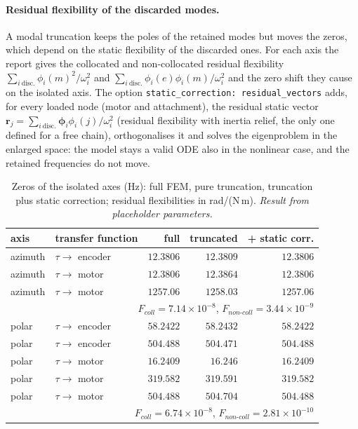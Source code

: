 \documentclass[10pt,a4paper]{article}
\numberwithin{equation}{section}
\begin{document}
\paragraph{Residual flexibility of the discarded modes.} A modal truncation keeps the poles of the retained modes but moves the zeros, which depend on the static flexibility of the discarded ones. For each axis the report gives the collocated and non-collocated residual flexibility $\sum_{i\ \text{disc.}}\phi_i(m)^2/\omega_i^2$ and $\sum_{i\ \text{disc.}}\phi_i(e)\phi_i(m)/\omega_i^2$ and the zero shift they cause on the isolated axis. The option \texttt{static\_correction: residual\_vectors} adds, for every loaded node (motor and attachment), the residual static vector $\mathbf r_j = \sum_{i\ \text{disc.}}\boldsymbol\phi_i\phi_i(j)/\omega_i^2$ (residual flexibility with inertia relief, the only one defined for a free chain), orthogonalises it and solves the eigenproblem in the enlarged space: the model stays a valid ODE also in the nonlinear case, and the retained frequencies do not move.
\begin{table}[H]\centering\small
\caption{Zeros of the isolated axes (Hz): full FEM, pure truncation, truncation plus static correction; residual flexibilities in rad/(N\,m). \emph{Result from placeholder parameters.}}\label{tab:modal_zeros}
\begin{tabular}{llrrr}\toprule
axis & transfer function & full & truncated & + static corr. \\ \midrule
azimuth & $\tau\to$ encoder & $12.3806$ & $12.3809$ & $12.3806$ \\
azimuth & $\tau\to$ motor & $12.3806$ & $12.3864$ & $12.3806$ \\
azimuth & $\tau\to$ motor & $1257.06$ & $1258.03$ & $1257.06$ \\
\multicolumn{5}{r}{\footnotesize $F_{coll} = 7.14\times10^{-8}$, $F_{non\text{-}coll} = 3.44\times10^{-9}$} \\ \midrule
polar & $\tau\to$ encoder & $58.2422$ & $58.2432$ & $58.2422$ \\
polar & $\tau\to$ encoder & $504.488$ & $504.471$ & $504.488$ \\
polar & $\tau\to$ motor & $16.2409$ & $16.246$ & $16.2409$ \\
polar & $\tau\to$ motor & $319.582$ & $319.591$ & $319.582$ \\
polar & $\tau\to$ motor & $504.488$ & $504.704$ & $504.488$ \\
\multicolumn{5}{r}{\footnotesize $F_{coll} = 6.74\times10^{-8}$, $F_{non\text{-}coll} = 2.81\times10^{-10}$} \\ \midrule
\bottomrule\end{tabular}\end{table}
\end{document}
